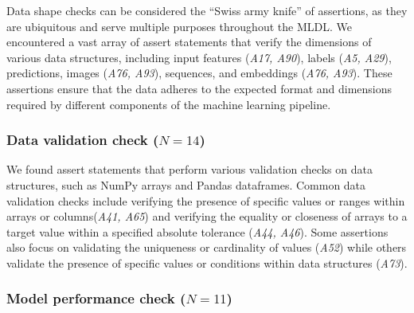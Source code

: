 Data shape checks can be considered the ``Swiss army knife'' of assertions, as they are ubiquitous and serve multiple purposes throughout the MLDL. We encountered a vast array of assert statements that verify the dimensions of various data structures, including input features (\emph{A17, A90}), labels (\emph{A5, A29}), predictions, images (\emph{A76, A93}), sequences, and embeddings (\emph{A76, A93}). These assertions ensure that the data adheres to the expected format and dimensions required by different components of the machine learning pipeline.


\subsubsection{Data validation check ($N = 14$)}

We found assert statements that perform various validation checks on data structures, such as NumPy arrays and Pandas dataframes. Common data validation checks include verifying the presence of specific values or ranges within arrays or columns(\emph{A41, A65}) and verifying the equality or closeness of arrays to a target value within a specified absolute tolerance (\emph{A44, A46}). Some assertions also focus on validating the uniqueness or cardinality of values (\emph{A52}) while others validate the presence of specific values or conditions within data structures (\emph{A73}).


\subsubsection{Model performance check ($N = 11$)}\label{sec:assert-model-perf}


